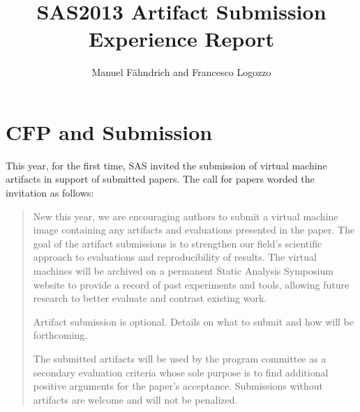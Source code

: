 \documentclass{article}
\title{SAS2013 Artifact Submission Experience Report}
\author{Manuel F\"ahndrich and Francesco Logozzo}
\begin{document}
\maketitle

\section*{CFP and Submission}
This year, for the first time, SAS invited the submission of virtual
machine artifacts in support of submitted papers. The call for papers worded the invitation as follows:

\begin{quote}\sffamily
New this year, we are encouraging authors to submit a virtual machine
image containing any artifacts and evaluations presented in the
paper. The goal of the artifact submissions is to strengthen our
field's scientific approach to evaluations and reproducibility of
results. The virtual machines will be archived on a permanent Static
Analysis Symposium website to provide a record of past experiments and
tools, allowing future research to better evaluate and contrast
existing work.

Artifact submission is optional. Details on what to submit and how
will be forthcoming.

The submitted artifacts will be used by the program committee as a
secondary evaluation criteria whose sole purpose is to find additional
positive arguments for the paper's acceptance. Submissions without
artifacts are welcome and will not be penalized.
\end{quote}
\end{document}
